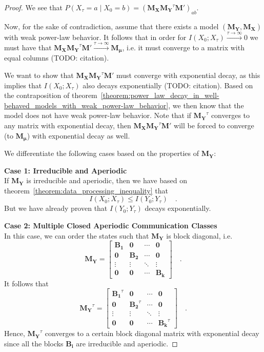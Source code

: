\documentclass[../../main.tex]{subfiles}
\begin{document}
\begin{proof}
        We see that $P(X_{\tau} = a \mid X_0 = b) = (\bm{M_X} \bm{M_Y}^\tau \bm{M'})_{ab}$.

        Now, for the sake of contradiction, assume that there exists a model $(\bm{M_Y}, \bm{M_X})$ with weak power-law behavior. It follows that in order for $I(X_0; X_{\tau}) \xrightarrow{\tau \to \infty} 0$ we must have that $\bm{M_X} \bm{M_Y}^\tau \bm{M'} \xrightarrow{\tau \to \infty} \bm{M_\mu}$, i.e. it must converge to a matrix with equal columns (TODO: citation). 
        
        We want to show that $\bm{M_X} \bm{M_Y}^\tau \bm{M'}$ must converge with exponential decay, as this implies that $I(X_0; X_{\tau})$ also decays exponentially (TODO: citation). Based on the contraposition of theorem~\ref{theorem:power_law_decay_in_well-behaved_models_with_weak_power-law_behavior}, we then know that the model does not have weak power-law behavior. Note that if $\bm{M_Y}^\tau$ converges to any matrix with exponential decay, then $\bm{M_X} \bm{M_Y}^\tau \bm{M'}$ will be forced to converge (to $\bm{M_\mu}$) with exponential decay as well.
        
        We differentiate the following cases based on the properties of $\bm{M_Y}$:

        \textbf{Case 1: Irreducible and Aperiodic} \\
        If $\bm{M_Y}$ is irreducible and aperiodic, then we have based on theorem~\ref{theorem:data_processing_inequality} that
        \[
            I(X_0; X_\tau) \leq I(Y_0; Y_\tau) \quad .
        \]
        But we have already proven that $I(Y_0; Y_\tau)$ decays exponentially.

        \textbf{Case 2: Multiple Closed Aperiodic Communication Classes} \\
        In this case, we can order the states such that $\bm{M_Y}$ is block diagonal, i.e.
        \[
            \bm{M_Y} = 
            \begin{bmatrix}
            \bm{B_1} & \bm{0} & \cdots & \bm{0} \\
            \bm{0} & \bm{B_2} & \cdots & \bm{0} \\
            \vdots & \vdots & \ddots & \vdots \\
            \bm{0} & \bm{0} & \cdots & \bm{B_k}
            \end{bmatrix}
            \quad .
        \]
        It follows that
        \[
            \bm{M_Y}^\tau = 
            \begin{bmatrix}
            \bm{B_1}^\tau & \bm{0} & \cdots & \bm{0} \\
            \bm{0} & \bm{B_2}^\tau & \cdots & \bm{0} \\
            \vdots & \vdots & \ddots & \vdots \\
            \bm{0} & \bm{0} & \cdots & \bm{B_k}^\tau
            \end{bmatrix}
            \quad .
        \]
        Hence, $\bm{M_Y}^\tau$ converges to a certain block diagonal matrix with exponential decay since all the blocks $\bm{B_i}$ are irreducible and aperiodic.


\end{proof}
\end{document}
